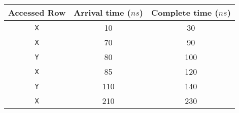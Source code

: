 \documentclass[a4paper, 11pt]{exam}
\begin{document}
\begin{enumerate}
\begin{center}
	\begin{tabular}{|c|c|c|}
		\hline
		\textbf{Accessed Row} & \textbf{Arrival time ($ns$)} & \textbf{Complete time ($ns$)} \\
		\hline
		\texttt{X}  & 10 & 30\\
		\hline
		\texttt{X}  & 70 & 90\\
		\hline
		\texttt{Y}  & 80 & 100\\
		\hline
		\texttt{X}  & 85 & 120\\
		\hline
		\texttt{Y}  & 110 & 140\\
		\hline
		\texttt{X} & 210 & 230\\
		\hline
	\end{tabular}
\end{center}


\end{enumerate}
\end{document}
